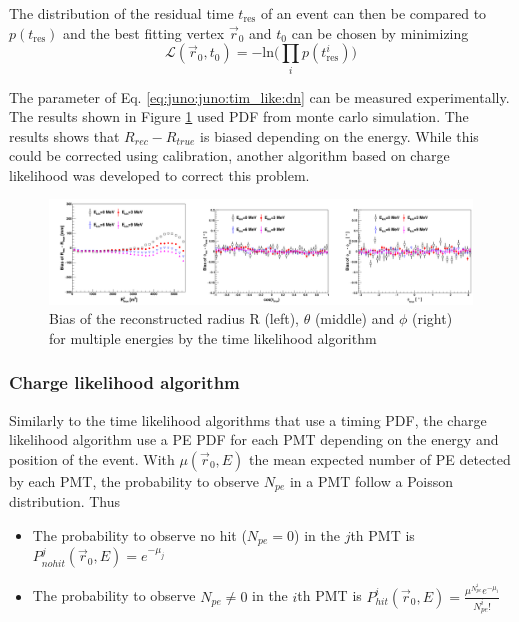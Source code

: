\documentclass[../main.tex]{subfiles}
\begin{document}
The distribution of the residual time $t_{\mathrm{res}}$ of an event can then be compared to $p(t_{\mathrm{res}})$ and the best fitting vertex $\vec{r}_0$ and $t_0$ can be chosen by minimizing
\begin{equation}
  \mathcal{L}(\vec{r}_0, t_0) = - \mathrm{ln} \bigg(\prod_i p(t^i_{\mathrm{res}}) \bigg)
\end{equation}

The parameter of Eq. \ref{eq:juno:juno:tim_like:dn} can be measured experimentally. The results shown in Figure \ref{fig:juno:rec:time_likelihood} used PDF from monte carlo simulation. The results shows that $R_{rec} - R_{true}$ is biased depending on the energy. While this could be corrected using calibration, another algorithm based on charge likelihood was developed to correct this problem.

\begin{figure}[ht]
  \centering
  \includegraphics[width=\linewidth]{images/juno/reco/time_likelihood_results.png}
  \caption{Bias of the reconstructed radius R (left), $\theta$ (middle) and $\phi$ (right) for multiple energies by the time likelihood algorithm}
  \label{fig:juno:rec:time_likelihood}
\end{figure}


\subsubsection{Charge likelihood algorithm}

Similarly to the time likelihood algorithms that use a timing PDF, the charge likelihood algorithm use a PE PDF for each PMT depending on the energy and position of the event. With $\mu(\vec{r}_0, E)$ the mean expected number of PE detected by each PMT, the probability to observe $N_{pe}$ in a PMT follow a Poisson distribution. Thus
\begin{itemize}
  \item The probability to observe no hit ($N_{pe} = 0$) in the $j$th PMT is $P^{j}_{nohit} (\vec{r}_0, E) = e^{-\mu_j}$
  \item The probability to observe $N_{pe} \neq 0$ in the $i$th PMT is $P^{i}_{hit} (\vec{r}_0, E) = \frac{\mu^{N^i_{pe}} e^{-\mu_i}}{N^i_{pe}!}$
\end{itemize}
\end{document}
